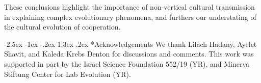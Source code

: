 \documentclass[12pt]{extarticle}
\makeatletter
\renewcommand\section{\@startsection {section}{1}{\z@}%
     {-2.5ex \@plus -1ex \@minus -.2ex}%
     {1.3ex \@plus.2ex}%
    {\Large\bfseries}}
\makeatother
\begin{document}
These conclusions highlight the importance of non-vertical cultural transmission in explaining complex evolutionary phenomena, and  furthers our understating of the cultural evolution of cooperation. 



{\small
\section*{Acknowledgements}
We thank Lilach Hadany, Ayelet Shavit, and Kaleda Krebs Denton for discussions and comments.
This work was supported in part by
the Israel Science Foundation 552/19 (YR),
and Minerva Stiftung Center for Lab Evolution (YR).
}
\end{document}
